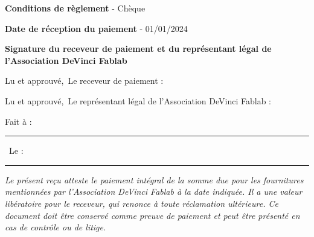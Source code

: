 \documentclass[11pt,a4paper]{article}
\begin{document}
\vspace{0.5cm}

\textbf{Conditions de règlement} - Chèque

\vspace{0.2cm}

\textbf{Date de réception du paiement} - 01/01/2024

\vspace{\fill}
\begin{framed}
    \begin{center}
        \textbf{Signature du receveur de paiement et du représentant légal de l'Association DeVinci Fablab}
    \end{center}

    \vspace{0.2cm}

    \begin{minipage}[t]{0.45\textwidth}
        \begin{flushleft}
            Lu et approuvé,\
            Le receveur de paiement :\
            \vspace{1.5cm}
        \end{flushleft}
    \end{minipage}\hfill
    \vrule width 0.75pt\hfill
    \begin{minipage}[t]{0.45\textwidth}
        \begin{flushright}
            Lu et approuvé,\
            Le représentant légal de l'Association DeVinci Fablab :\
            \vspace{1.5cm}
        \end{flushright}
    \end{minipage}

    \vspace{0.5cm}
    \begin{center}
        Fait à : \rule{3cm}{0.75pt} \
        Le : \rule{3cm}{0.75pt}
    \end{center}
\end{framed}



\vspace{0.5cm}
\textit{\footnotesize Le présent reçu atteste le paiement intégral de la somme due pour les fournitures mentionnées par l'Association DeVinci Fablab à la date indiquée. Il a une valeur libératoire pour le receveur, qui renonce à toute réclamation ultérieure. Ce document doit être conservé comme preuve de paiement et peut être présenté en cas de contrôle ou de litige. }
\end{document}
